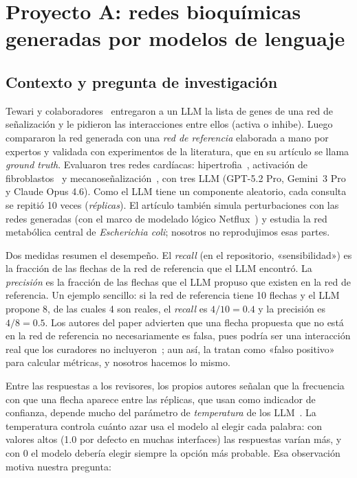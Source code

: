 \documentclass[unnumsec,webpdf,contemporary,large]{oup-authoring-template}
\begin{document}
\section{Proyecto A: redes bioquímicas generadas por modelos de lenguaje}\label{sec:A}

\subsection{Contexto y pregunta de investigación}\label{sec:A:contexto}

Tewari y colaboradores~\cite{tewari2026} entregaron a un LLM la lista de genes de una red de señalización y le pidieron las interacciones entre ellos (activa o inhibe). Luego compararon la red generada con una \emph{red de referencia} elaborada a mano por expertos y validada con experimentos de la literatura, que en su artículo se llama \emph{ground truth}. Evaluaron tres redes cardíacas: hipertrofia~\cite{ryall2012}, activación de fibroblastos~\cite{zeigler2016} y mecanoseñalización~\cite{tan2017}, con tres LLM (GPT-5.2 Pro, Gemini~3 Pro y Claude Opus 4.6). Como el LLM tiene un componente aleatorio, cada consulta se repitió 10 veces (\emph{réplicas}). El artículo también simula perturbaciones con las redes generadas (con el marco de modelado lógico Netflux~\cite{clark2025}) y estudia la red metabólica central de \emph{Escherichia coli}; nosotros no reprodujimos esas partes.

Dos medidas resumen el desempeño. El \emph{recall} (en el repositorio, «sensibilidad») es la fracción de las flechas de la red de referencia que el LLM encontró. La \emph{precisión} es la fracción de las flechas que el LLM propuso que existen en la red de referencia. Un ejemplo sencillo: si la red de referencia tiene 10 flechas y el LLM propone 8, de las cuales 4 son reales, el \emph{recall} es $4/10=0.4$ y la precisión es $4/8=0.5$. Los autores del paper advierten que una flecha propuesta que no está en la red de referencia no necesariamente es falsa, pues podría ser una interacción real que los curadores no incluyeron~\cite{tewari2026}; aun así, la tratan como «falso positivo» para calcular métricas, y nosotros hacemos lo mismo.

Entre las respuestas a los revisores, los propios autores señalan que la frecuencia con que una flecha aparece entre las réplicas, que usan como indicador de confianza, depende mucho del parámetro de \emph{temperatura} de los LLM~\cite{tewari2026}. La temperatura controla cuánto azar usa el modelo al elegir cada palabra: con valores altos (1.0 por defecto en muchas interfaces) las respuestas varían más, y con 0 el modelo debería elegir siempre la opción más probable. Esa observación motiva nuestra pregunta:
\end{document}
